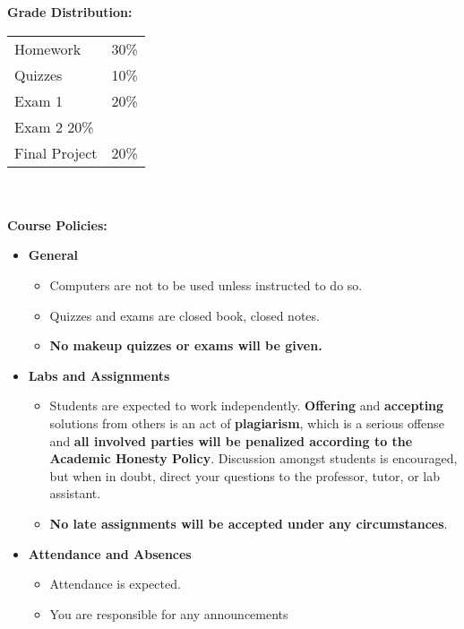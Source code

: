 \documentclass[11pt]{article}
\begin{document}
\textbf {\large Grade Distribution:} \\
\hspace*{40mm}
\begin{tabular}{ l l }
Homework & 30\% \\
Quizzes  & 10\% \\
Exam 1 & 20\% \\
Exam 2 20\% \\
Final Project  & 20\% \\
\end{tabular} \\\\


\textbf {\large Course Policies:}
\begin{itemize}
	\item \textbf {General}
		\begin{itemize}
			\item Computers are not to be used unless instructed to do so.
			\item Quizzes and exams are closed book, closed notes.
			\item \textbf {No makeup quizzes or exams will be given.}
		\end{itemize}
	\item \textbf {Labs and Assignments}
		\begin{itemize}
			\item Students are expected to work independently. \textbf{Offering} and \textbf{accepting} solutions from others is an act of \textbf{plagiarism}, which is a serious offense and \textbf{all involved parties will be penalized according to the Academic Honesty Policy}. Discussion amongst students is encouraged, but when in doubt, direct your questions to the professor, tutor, or lab assistant.
			\item \textbf{No late assignments will be accepted under any circumstances}.
		\end{itemize}
	\item \textbf{Attendance and Absences}
		\begin{itemize}
			\item Attendance is expected.
			\item You are responsible for any announcements
		\end{itemize}
\end{itemize}
\end{document}
